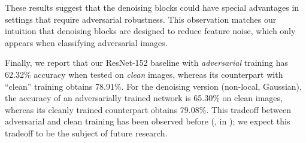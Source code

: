 \documentclass[10pt,twocolumn,letterpaper]{article}
\begin{document}
These results suggest that the denoising blocks could have special advantages in settings that require adversarial robustness. This observation matches our intuition that denoising blocks are designed to reduce feature noise, which only appears when classifying adversarial images.

Finally, we report that our ResNet-152 baseline with \emph{adversarial} training has 62.32\% accuracy when tested on \emph{clean} images, whereas its counterpart with ``clean'' training obtains 78.91\%. 
For the denoising version (non-local, Gaussian), the accuracy of an adversarially trained network is 65.30\% on clean images, whereas its cleanly trained counterpart obtains 79.08\%. This tradeoff between adversarial and clean training has been observed before (\eg, in \cite{Tsipras2018}); we expect this tradeoff to be the subject of future research.

\renewcommand\arraystretch{1.05}
\setlength{\tabcolsep}{5pt}
\begin{table}[t]
\centering
{}
\vspace{.5em}
\caption{\textbf{Accuracy on clean images} in the ImageNet validation set when trained on clean images. 
All numbers except the first row are reported as the accuracy difference comparing with the first R-152 baseline result.
For R-152, we run training 3 times independently, to show the natural random variation of the same architecture.
All denoising models show \emph{no significant difference}, and are within 0.2\% of the baseline R-152's result.
}
\label{tab:clean}
\vspace{-1em}
\end{table}
\end{document}
